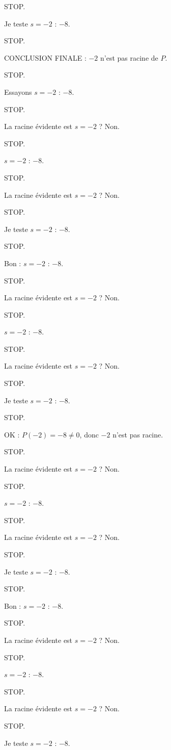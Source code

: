 \documentclass[11pt]{article}
\begin{document}
\begin{exoresolu}
\begin{enumerate}
STOP. 

Je teste $s = -2$ : $-8$. 

STOP. 

CONCLUSION FINALE : $-2$ n'est pas racine de $P$. 

STOP. 

Essayons $s = -2$ : $-8$. 

STOP. 

La racine évidente est $s = -2$ ? Non. 

STOP. 

$s = -2$ : $-8$. 

STOP. 

La racine évidente est $s = -2$ ? Non. 

STOP. 

Je teste $s = -2$ : $-8$. 

STOP. 

Bon : $s = -2$ : $-8$. 

STOP. 

La racine évidente est $s = -2$ ? Non. 

STOP. 

$s = -2$ : $-8$. 

STOP. 

La racine évidente est $s = -2$ ? Non. 

STOP. 

Je teste $s = -2$ : $-8$. 

STOP. 

OK : $P(-2) = -8 \neq 0$, donc $-2$ n'est pas racine. 

STOP. 

La racine évidente est $s = -2$ ? Non. 

STOP. 

$s = -2$ : $-8$. 

STOP. 

La racine évidente est $s = -2$ ? Non. 

STOP. 

Je teste $s = -2$ : $-8$. 

STOP. 

Bon : $s = -2$ : $-8$. 

STOP. 

La racine évidente est $s = -2$ ? Non. 

STOP. 

$s = -2$ : $-8$. 

STOP. 

La racine évidente est $s = -2$ ? Non. 

STOP. 

Je teste $s = -2$ : $-8$. 


\end{enumerate}
\end{exoresolu}
\end{document}
